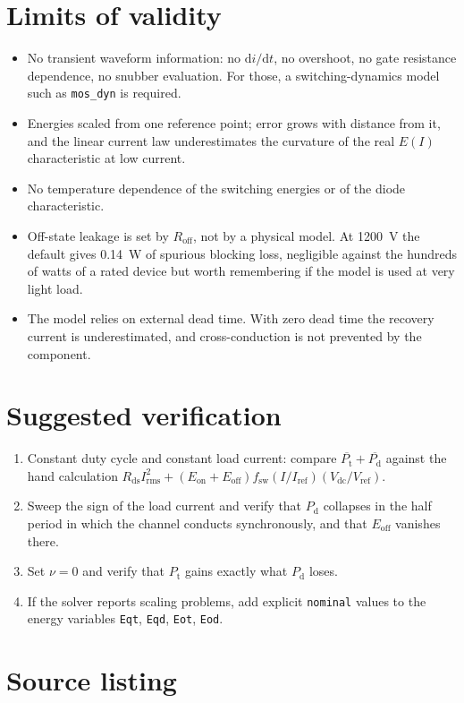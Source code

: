 \documentclass[11pt,a4paper]{article}
\newcommand{\Eon}{E_\mathrm{on}}
\newcommand{\Eoff}{E_\mathrm{off}}
\newcommand{\dd}{\mathrm{d}}
\begin{document}
\section{Limits of validity}

\begin{itemize}
\item No transient waveform information: no $\dd i/\dd t$, no overshoot, no gate
      resistance dependence, no snubber evaluation. For those, a
      switching-dynamics model such as \texttt{mos\_dyn} is required.
\item Energies scaled from one reference point; error grows with distance from
      it, and the linear current law underestimates the curvature of the real
      $E(I)$ characteristic at low current.
\item No temperature dependence of the switching energies or of the diode
      characteristic.
\item Off-state leakage is set by $R_\mathrm{off}$, not by a physical model. At
      \SI{1200}{\volt} the default gives \SI{0.14}{\watt} of spurious blocking
      loss, negligible against the hundreds of watts of a rated device but worth
      remembering if the model is used at very light load.
\item The model relies on external dead time. With zero dead time the recovery
      current is underestimated, and cross-conduction is not prevented by the
      component.
\end{itemize}

\section{Suggested verification}

\begin{enumerate}
\item Constant duty cycle and constant load current: compare
      $\overline{P_\mathrm{t}} + \overline{P_\mathrm{d}}$ against the hand
      calculation
      $R_\mathrm{ds} I_\mathrm{rms}^{2} + (\Eon + \Eoff) f_\mathrm{sw}
      (I/I_\mathrm{ref})(V_\mathrm{dc}/V_\mathrm{ref})$.
\item Sweep the sign of the load current and verify that $P_\mathrm{d}$
      collapses in the half period in which the channel conducts synchronously,
      and that $\Eoff$ vanishes there.
\item Set $\nu = 0$ and verify that $P_\mathrm{t}$ gains exactly what
      $P_\mathrm{d}$ loses.
\item If the solver reports scaling problems, add explicit \texttt{nominal}
      values to the energy variables \texttt{Eqt}, \texttt{Eqd}, \texttt{Eot},
      \texttt{Eod}.
\end{enumerate}

\appendix
\section{Source listing}


\end{document}
